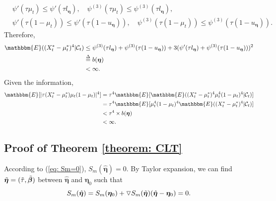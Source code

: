 \documentclass{article}
\theoremstyle{definition}
\begin{document}
\begin{equation*}
    \begin{aligned}
    &\psi'(\tau\mu_t) \leq \psi'(\tau l_{\bm{\eta}}), \quad \psi^{(3)}(\tau\mu_t) \leq \psi^{(3)}(\tau l_{\bm{\eta}}), \\
        &\psi'(\tau(1-\mu_t)) \leq \psi'(\tau (1-u_{\bm{\eta}})), \quad \psi^{(3)}(\tau(1-\mu_t)) \leq \psi^{(3)}(\tau (1-u_{\bm{\eta}})).
    \end{aligned}
\end{equation*}
Therefore, 
\begin{equation*}
\begin{aligned}
   \mathbbm{E}((X_t^*-\mu_t^*)^4|\mathcal{C}_t)& \leq \psi^{(3)}(\tau l_{\bm{\eta}})+\psi^{(3)}(\tau (1-u_{\bm{\eta}}))+3(\psi'(\tau l_{\bm{\eta}})+\psi^{(3)}(\tau (1-u_{\bm{\eta}})))^2 \\
   &\overset{\Delta}{=} b(\bm{\eta}) \\
   &<\infty.
\end{aligned}
\end{equation*}
Given the information, 
\begin{equation*}
    \begin{aligned}
    \mathbbm{E}[|\tau(X_t^*-\mu_t^*)\mu_t(1-\mu_t)|^4]&=\tau^4\mathbbm{E}[\mathbbm{E}((X_t^*-\mu_t^*)^4\mu^4_t(1-\mu_t)^4|\mathcal{C}_t)]\\
    &=\tau^4 \mathbbm{E}[\mu^4_t(1-\mu_t)^4\mathbbm{E}((X_t^*-\mu_t^*)^4|\mathcal{C}_t)] \\
    &<\tau^4 \times b(\bm{\eta})\\
    &< \infty.
    \end{aligned}
\end{equation*}
\label{proof: bounded fourth moment}

\subsection{Proof of Theorem \ref{theorem: CLT}}
\label{proof: CLT}
According to (\ref{eq: Sm=0}), $S_m(\hat{\bm{\eta}}) = 0.$
By Taylor expansion, we can find $\Tilde{\bm{\eta}} = (\Tilde{\tau},\Tilde{\bm{\beta}})$ between $\hat{\bm{\eta}}$ and $\bm{\eta}_0$ such that 
\begin{equation}
    \label{eq: taylor expansion}
    S_m(\hat{\bm{\eta}}) = S_m(\bm{\eta}_0)+\triangledown S_m(\Tilde{\bm{\eta}})(\hat{\bm{\eta}}-\bm{\eta}_0) = 0.
\end{equation}
\end{document}
